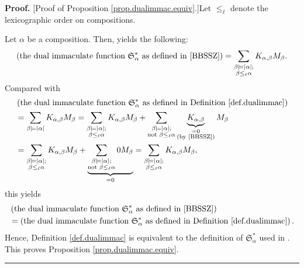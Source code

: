 \documentclass[numbers=enddot,12pt,final,onecolumn,notitlepage,abstracton]{scrartcl}%
\theoremstyle{definition}
\newenvironment{proof}[1][Proof]{\noindent\textbf{#1.} }{\ \rule{0.5em}{0.5em}}
\newenvironment{verlong}{}{}
\let\sumnonlimits\sum
\renewcommand{\sum}{\sumnonlimits\limits}
\begin{document}
\begin{verlong}
\begin{proof}
[Proof of Proposition \ref{prop.dualimmac.equiv}.]Let $\leq_{\ell}$ denote the
lexicographic order on compositions.

Let $\alpha$ be a composition. Then, \cite[Proposition 3.36]{BBSSZ} yields the
following:%
\[
\left(  \text{the dual immaculate function }\mathfrak{S}_{\alpha}^{\ast}\text{
as defined in \cite{BBSSZ}}\right)  =\sum_{\substack{\beta\models\left\vert
\alpha\right\vert ;\\\beta\leq_{\ell}\alpha}}K_{\alpha,\beta}M_{\beta}.
\]
Compared with%
\begin{align*}
&  \left(  \text{the dual immaculate function }\mathfrak{S}_{\alpha}^{\ast
}\text{ as defined in Definition \ref{def.dualimmac}}\right) \\
&  =\sum_{\beta\models\left\vert \alpha\right\vert }K_{\alpha,\beta}M_{\beta
}=\sum_{\substack{\beta\models\left\vert \alpha\right\vert ;\\\beta\leq_{\ell
}\alpha}}K_{\alpha,\beta}M_{\beta}+\sum_{\substack{\beta\models\left\vert
\alpha\right\vert ;\\\text{not }\beta\leq_{\ell}\alpha}}\underbrace{K_{\alpha
,\beta}}_{\substack{=0\\\text{(by \cite[Proposition 3.15 (2)]{BBSSZ})}%
}}M_{\beta}\\
&  =\sum_{\substack{\beta\models\left\vert \alpha\right\vert ;\\\beta
\leq_{\ell}\alpha}}K_{\alpha,\beta}M_{\beta}+\underbrace{\sum_{\substack{\beta
\models\left\vert \alpha\right\vert ;\\\text{not }\beta\leq_{\ell}\alpha
}}0M_{\beta}}_{=0}=\sum_{\substack{\beta\models\left\vert \alpha\right\vert
;\\\beta\leq_{\ell}\alpha}}K_{\alpha,\beta}M_{\beta},
\end{align*}
this yields%
\begin{align*}
&  \left(  \text{the dual immaculate function }\mathfrak{S}_{\alpha}^{\ast
}\text{ as defined in \cite{BBSSZ}}\right) \\
&  =\left(  \text{the dual immaculate function }\mathfrak{S}_{\alpha}^{\ast
}\text{ as defined in Definition \ref{def.dualimmac}}\right)  .
\end{align*}
Hence, Definition \ref{def.dualimmac} is equivalent to the definition of
$\mathfrak{S}_{\alpha}^{\ast}$ used in \cite{BBSSZ}. This proves Proposition
\ref{prop.dualimmac.equiv}.
\end{proof}
\end{verlong}
\end{document}
